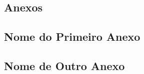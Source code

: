 
\begin{anexosenv}
  \renewcommand{\partanexos}{
  \part*{Anexos}}
  \partanexos

  \chapter{Nome do Primeiro Anexo}
  \lipsum[30] %

  \chapter{Nome de Outro Anexo}

  \lipsum[32] %
\end{anexosenv}
